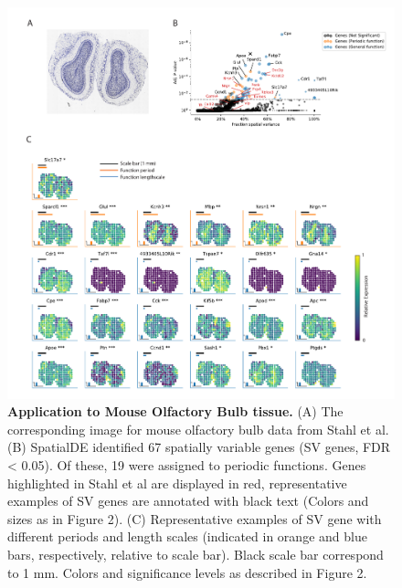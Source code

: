 \begin{figure}
    \centering
    \includegraphics[width=\textwidth]{"SuppFig5"}
    \caption[Application to Mouse Olfactory Bulb tissue]{\textbf{Application to Mouse Olfactory Bulb tissue.} (A) The corresponding image for mouse olfactory bulb data from Stahl et al. (B) SpatialDE identified 67 spatially variable genes (SV genes, FDR < 0.05). Of these, 19 were assigned to periodic functions. Genes highlighted in Stahl et al are displayed in red, representative examples of SV genes are annotated with black text (Colors and sizes as in Figure 2). (C) Representative examples of SV gene with different periods and length scales (indicated in orange and blue bars, respectively, relative to scale bar). Black scale bar correspond to 1 mm. Colors and significance levels as described in Figure 2.}
    \label{fig:ss5}
\end{figure}

